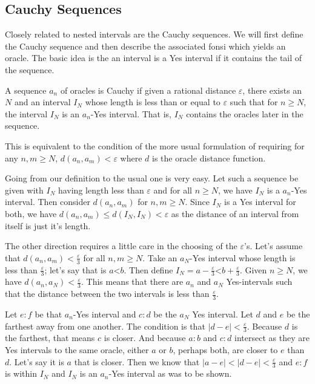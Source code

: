 \documentclass[12pt]{article}
\theoremstyle{remark}
\newcommand{\lt}{\mathord{<}}
\begin{document}
\subsection{Cauchy Sequences}

Closely related to nested intervals are the Cauchy sequences. We will first define the Cauchy sequence and then describe the associated fonsi which yields an oracle. The basic idea is the an interval is a Yes interval if it contains the tail of the sequence. 

A sequence $a_n$ of oracles is Cauchy if given a rational distance $\varepsilon$, there exists an $N$ and an interval $I_N$ whose length is less than or equal to $\varepsilon$ such that for $n \geq N$, the interval $I_N$ is an $a_n$-Yes interval. That is, $I_N$ contains the oracles later in the sequence. 

This is equivalent to the condition of the more usual formulation of requiring for any $n, m \geq N$, $d(a_n,  a_m) < \varepsilon$ where $d$ is the oracle distance function. 

Going from our definition to the usual one is very easy. Let such a sequence be given with $I_N$ having length less than $\varepsilon$ and for all $n \geq N$, we have $I_N$ is a $a_n$-Yes interval. Then consider $d(a_n, a_m)$ for $n, m \geq N$. Since $I_N$ is a Yes interval for both, we have $d(a_n, a_m) \leq d(I_N, I_N) < \varepsilon$ as the distance of an interval from itself is just it's length. 

The other direction requires a little care in the choosing of the $\varepsilon$'s. Let's assume that $d(a_n, a_m) < \frac{\varepsilon}{3}$ for all $n, m \geq N$. Take an $a_N$-Yes interval whose length is less than $\frac{\varepsilon}{3}$; let's say that is $a \lt b$. Then define $I_N = a-\frac{\varepsilon}{3} \lt b + \frac{\varepsilon}{3}$. Given $n \geq N$, we have $d(a_n, a_N) < \frac{\varepsilon}{3}$. This means that there are $a_n$ and $a_N$ Yes-intervals such that the distance between the two intervals is less than $\frac{\varepsilon}{3}$. 

Let $e:f$ be that $a_n$-Yes interval and $c:d$ be the $a_N$ Yes interval. Let $d$ and $e$ be the farthest away from one another. The condition is that $|d-e| < \frac{\varepsilon}{3}$. Because $d$ is the farthest, that means $c$ is closer. And because $a:b$ and $c:d$ intersect as they are Yes intervals to the same oracle, either $a$ or $b$, perhaps both, are closer to $e$ than $d$. Let's say it is $a$ that is closer. Then we know that $|a-e| < |d-e| < \frac{\varepsilon}{3}$ and $e:f$ is within $I_N$ and $I_N$ is an $a_n$-Yes interval as was to be shown. 
\end{document}
